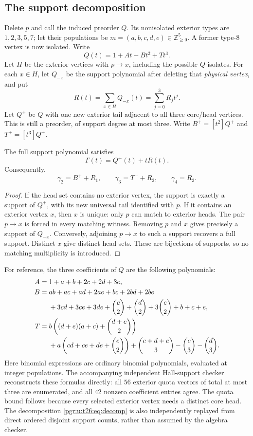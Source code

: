 \documentclass[11pt]{article}
\numberwithin{equation}{section}
\theoremstyle{definition}\newtheorem{definition}[theorem]{Definition}\newtheorem{remark}[theorem]{Remark}
\newcommand{\N}{\mathbb Z_{\ge0}}          %
\newcommand{\Qp}{Q^{+}}                    %
\newcommand{\Bp}{B^{+}}                    %
\newcommand{\Tp}{T^{+}}                    %
\begin{document}
\subsection{The support decomposition}
Delete $p$ and call the induced preorder $Q$. Its nonisolated exterior types are $1,2,3,5,7$; let their populations be $m=(a,b,c,d,e)\in\N^5$. A former type-$8$ vertex is now isolated. Write
\[
Q(t)=1+A t+B t^2+T t^3.
\]
Let $H$ be the exterior vertices with $p\to x$, including the possible $Q$-isolates. For each $x\in H$, let $Q_{-x}$ be the support polynomial after deleting that \emph{physical vertex}, and put
\[
R(t)=\sum_{x\in H}Q_{-x}(t)=\sum_{j=0}^{3}R_jt^j.
\]
Let $\Qp$ be $Q$ with one new exterior tail adjacent to all three core/head vertices. This is still a preorder, of support degree at most three. Write $\Bp=[t^2]\Qp$ and $\Tp=[t^3]\Qp$.

\begin{proposition}\label{pgr:u:t26:prop:decomp}
The full support polynomial satisfies
\begin{equation}\label{pgr:u:t26:eq:decomp}
\Gamma(t)=\Qp(t)+tR(t).
\end{equation}
Consequently,
\begin{equation}\label{pgr:u:t26:eq:coeffs}
\gamma_2=\Bp+R_1,\qquad\gamma_3=\Tp+R_2,\qquad\gamma_4=R_3.
\end{equation}
\end{proposition}
\begin{proof}
If the head set contains no exterior vertex, the support is exactly a support of $\Qp$, with its new universal tail identified with $p$. If it contains an exterior vertex $x$, then $x$ is unique: only $p$ can match to exterior heads. The pair $p\to x$ is forced in every matching witness. Removing $p$ and $x$ gives precisely a support of $Q_{-x}$. Conversely, adjoining $p\to x$ to such a support recovers a full support. Distinct $x$ give distinct head sets. These are bijections of supports, so no matching multiplicity is introduced.
\end{proof}

For reference, the three coefficients of $Q$ are the following polynomials:
\begin{align}
A={}&1+a+b+2c+2d+3e,\label{pgr:u:t26:eq:A}\\
B={}&ab+ac+ad+2ae+bc+2bd+2be\notag\\
 &+3cd+3ce+3de+\binom c2+\binom d2+3\binom e2+b+c+e,\label{pgr:u:t26:eq:B}\\
T={}&b\left((d+e)(a+c)+\binom{d+e}{2}\right)\notag\\
 &+a\left(cd+ce+de+\binom e2\right)
 +\binom{c+d+e}{3}-\binom c3-\binom d3.\label{pgr:u:t26:eq:T}
\end{align}
Here binomial expressions are ordinary binomial polynomials, evaluated at integer populations. The accompanying independent Hall-support checker reconstructs these formulas directly: all $56$ exterior quota vectors of total at most three are enumerated, and all $42$ nonzero coefficient entries agree. The quota bound follows because every selected exterior vertex needs a distinct core head. The decomposition \eqref{pgr:u:t26:eq:decomp} is also independently replayed from direct ordered disjoint support counts, rather than assumed by the algebra checker.
\end{document}
